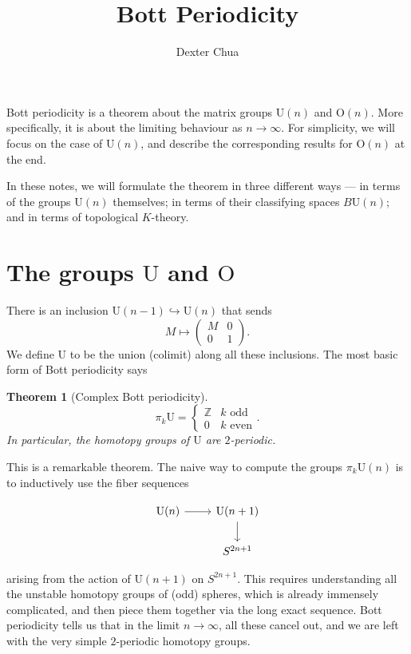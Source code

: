 \documentclass{shortart}
\author{Dexter Chua}
\title{Bott Periodicity}
\newtheorem{thm}{Theorem}
\theoremstyle{definition}
\newcommand\U{\mathrm{U}}
\newcommand\BU{B\mathrm{U}}
\newcommand\Z{\mathbb{Z}}
\renewcommand\O{\mathrm{O}}
\begin{document}
Bott periodicity is a theorem about the matrix groups $\U(n)$ and $\O(n)$. More specifically, it is about the limiting behaviour as $n \to \infty$. For simplicity, we will focus on the case of $\U(n)$, and describe the corresponding results for $\O(n)$ at the end.

In these notes, we will formulate the theorem in three different ways --- in terms of the groups $\U(n)$ themselves; in terms of their classifying spaces $\BU(n)$; and in terms of topological $K$-theory.
\section{The groups \texorpdfstring{$\U$}{U} and \texorpdfstring{$\O$}{O}}

There is an inclusion $\U(n - 1) \hookrightarrow \U(n)$ that sends
\[
  M \mapsto
  \begin{pmatrix}
    M & 0\\
    0 & 1
  \end{pmatrix}.
\]
We define $\U$ to be the union (colimit) along all these inclusions. The most basic form of Bott periodicity says

\begin{thm}[Complex Bott periodicity]
  \[
    \pi_k \U = 
    \begin{cases}
      \Z & k\text{ odd}\\
      0 & k\text{ even}
    \end{cases}.
  \]
  In particular, the homotopy groups of $\U$ are \emph{$2$-periodic}.
\end{thm}
This is a remarkable theorem. The naive way to compute the groups $\pi_k \U(n)$ is to inductively use the fiber sequences
\begin{useimager}
  \[
    \begin{tikzcd}
      \U(n) \ar[r] & \U(n + 1) \ar[d]\\
      & S^{2n + 1}
    \end{tikzcd}
  \]
\end{useimager}
arising from the action of $\U(n + 1)$ on $S^{2n + 1}$. This requires understanding all the unstable homotopy groups of (odd) spheres, which is already immensely complicated, and then piece them together via the long exact sequence. Bott periodicity tells us that in the limit $n \to \infty$, all these cancel out, and we are left with the very simple $2$-periodic homotopy groups.
\end{document}
